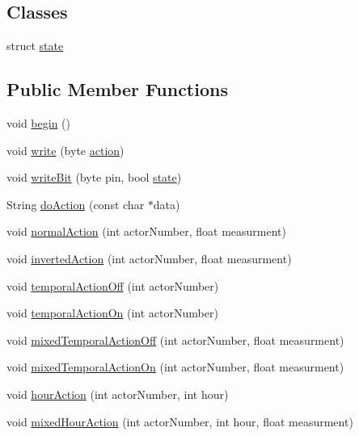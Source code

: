 \subsection*{Classes}
\begin{DoxyCompactItemize}
\item 
struct \hyperlink{class_jetpack_da/d35/struct_jetpack_1_1state}{state}
\end{DoxyCompactItemize}
\subsection*{Public Member Functions}
\begin{DoxyCompactItemize}
\item 
void \hyperlink{class_jetpack_a5a53e1ebf7aaf3bf3e0d37ea64ca09a7}{begin} ()
\item 
void \hyperlink{class_jetpack_a338f1af8cbc6504ac69b47c7328569b5}{write} (byte \hyperlink{class_jetpack_aca3142925a7b0834b34ae91d26af7765}{action})
\item 
void \hyperlink{class_jetpack_a79ae7bc3c1828a0551a7c005c4f8bd00}{write\+Bit} (byte pin, bool \hyperlink{class_jetpack_da/d35/struct_jetpack_1_1state}{state})
\item 
String \hyperlink{class_jetpack_af9acedb606340c26c2636c282b54dff1}{do\+Action} (const char $\ast$data)
\item 
void \hyperlink{class_jetpack_a65ce9533c39fa71e4945b970bf14b980}{normal\+Action} (int actor\+Number, float measurment)
\item 
void \hyperlink{class_jetpack_adacfc35fab4a621357caf98ce1c9cb54}{inverted\+Action} (int actor\+Number, float measurment)
\item 
void \hyperlink{class_jetpack_a2991b302cd99bf89325f9b66b104d575}{temporal\+Action\+Off} (int actor\+Number)
\item 
void \hyperlink{class_jetpack_ad011d904f639accb5f94ef806846ef59}{temporal\+Action\+On} (int actor\+Number)
\item 
void \hyperlink{class_jetpack_af2f567ef6311a8fc2f7bb948837667b7}{mixed\+Temporal\+Action\+Off} (int actor\+Number, float measurment)
\item 
void \hyperlink{class_jetpack_af44bc8a08818e4433dfb1c7104601f12}{mixed\+Temporal\+Action\+On} (int actor\+Number, float measurment)
\item 
void \hyperlink{class_jetpack_acd6889af2fe5b057c6bd51b6dac827ef}{hour\+Action} (int actor\+Number, int hour)
\item 
void \hyperlink{class_jetpack_ac1a49ab4867718cdb415ad74c2066b9d}{mixed\+Hour\+Action} (int actor\+Number, int hour, float measurment)

\end{DoxyCompactItemize}
